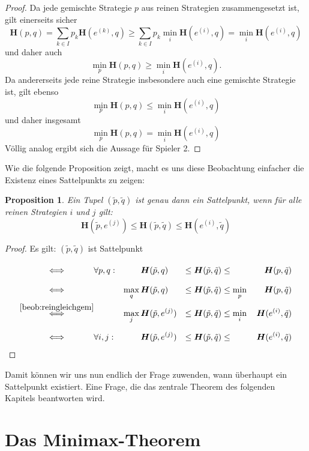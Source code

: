 \documentclass[a4paper,ngerman,12pt,bibtotoc]{scrartcl}
\theoremstyle{definition}
\theoremstyle{plain}
\newtheorem{prop}[defn]{Proposition}
\theoremstyle{remark}
\renewcommand{\_}{\mathpunct{.}\,}
\newcommand{\?}{\,{:}\,}
\renewcommand{\sp}{\tilde{p}}		%
\newcommand{\sq}{\tilde{q}}		%
\newcommand{\EH}{\boldsymbol{H}}
\begin{document}
	\begin{proof}
		Da jede gemischte Strategie $p$ aus reinen Strategien zusammengesetzt ist, gilt einerseits sicher
		\[\EH(p,q) = \sum_{k\in I} p_k \EH(e^{(k)}, q) \geq \sum_{k\in I} p_k \min_{i}\EH(e^{(i)}, q) = \min_{i}\EH(e^{(i)}, q)\]
		und daher auch 
		\[\min_p\EH(p,q) \geq \min_i \EH(e^{(i)},q).\]
		Da andererseits jede reine Strategie insbesondere auch eine gemischte Strategie ist, gilt ebenso
		\[\min_p\EH(p,q) \leq \min_i \EH(e^{(i)},q)\]
		und daher insgesamt
		\[\min_p\EH(p,q) = \min_i \EH(e^{(i)},q)\]
		Völlig analog ergibt sich die Aussage für Spieler 2.
	\end{proof}

	Wie die folgende Proposition zeigt, macht es uns diese Beobachtung einfacher die Existenz eines Sattelpunkts zu zeigen:
	
	\begin{prop}\label{prop:reinerSattel}
		Ein Tupel $(\sp,\sq)$ ist genau dann ein Sattelpunkt, wenn für alle \emph{reinen} Strategien $i$ und $j$ gilt:
		\[\EH(\sp,e^{(j)}) \leq \EH(\sp,\sq) \leq \EH(e^{(i)},\sq)\]
	\end{prop}
	
	\begin{proof}
		Es gilt: $(\sp,\sq)$ ist Sattelpunkt
		\begin{alignat*}{6}
		\overset{\phantom{\Cref{beob:reingleichgem}}}{\iff}
		&\forall p,q:	&	 	&\EH(\sp,q) &\leq \EH(\sp,\sq) &\leq 			&\EH(p,\sq) \\
		\overset{\phantom{\Cref{beob:reingleichgem}}}{\iff}
		&				&\max_q\,&\EH(\sp,q) &\leq \EH(\sp,\sq) &\leq \min_p\,	&\EH(p,\sq) \\
		\overset{\Cref{beob:reingleichgem}}{\iff}	
		&				&\max_j\,&\EH(\sp,e^{(j)}) &\leq \EH(\sp,\sq) &\leq \min_i\,&\EH(e^{(i)},\sq) \\
		\overset{\phantom{\Cref{beob:reingleichgem}}}{\iff}
		&\forall i,j: 	&		&\EH(\sp,e^{(j)}) &\leq \EH(\sp,\sq) &\leq 			&\EH(e^{(i)},\sq)		
		\end{alignat*}
	\end{proof}
	
	Damit können wir uns nun endlich der Frage zuwenden, wann überhaupt ein Sattelpunkt existiert. Eine Frage, die das zentrale Theorem des folgenden Kapitels beantworten wird.
	
		
	\section{Das Minimax-Theorem}\label{sec:Minimax}
	
\end{document}
